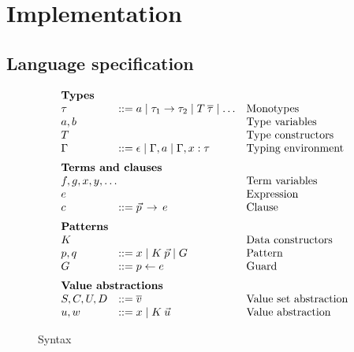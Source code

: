 \chapter{Implementation}

\section{Language specification}



\begin{figure}[t]
\centering
\[
  \begin{array}{l l l}
     \multicolumn{3}{l}{\textbf{Types}} \\
     \tau & ::= a \mid \tau_1 \rightarrow \tau_2 \mid T\:\overline{\tau} \mid \dots & \text{Monotypes} \\
     \multicolumn{2}{l}{a, b} & \text{Type variables} \\
     T &                                                              & \text{Type constructors} \\
     \Gamma & ::= \epsilon \mid \Gamma, a \mid \Gamma, x : \tau  & \text{Typing environment} \\[2mm]
     \multicolumn{3}{l}{\textbf{Terms and clauses}} \\
     \multicolumn{2}{l}{f,g,x,y,\dots}        & \text{Term variables} \\
     e &                                      & \text{Expression} \\
     c & ::= \vec{p} \, \rightarrow \, e      & \text{Clause} \\[2mm]
     \multicolumn{3}{l}{\textbf{Patterns}} \\
     K &                                      & \text{Data constructors} \\
     p,q & ::= x \mid K\: \vec{p} \mid G      & \text{Pattern} \\
     G & ::= p \leftarrow e                 & \text{Guard} \\[2mm]
     \multicolumn{3}{l}{\textbf{Value abstractions}} \\
     S,C,U,D & ::= \overline{v}             & \text{Value set abstraction} \\
     u,w & ::= x \mid K\: \vec{u}           & \text{Value abstraction} 
  \end{array}
\]
\caption{Syntax}
\label{fig:alg_syntax}
\end{figure}
